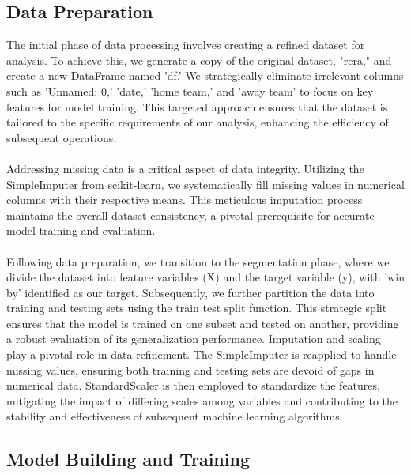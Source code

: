 \documentclass[letterpaper]{article}
\begin{document}
		\subsection*{Data Preparation}
		The initial phase of data processing involves creating a refined dataset for analysis. To achieve this, we generate a copy of the original dataset, "rera," and create a new DataFrame named 'df.' We strategically eliminate irrelevant columns such as 'Unnamed: 0,' 'date,' 'home team,' and 'away team' to focus on key features for model training. This targeted approach ensures that the dataset is tailored to the specific requirements of our analysis, enhancing the efficiency of subsequent operations.\\\\
		Addressing missing data is a critical aspect of data integrity. Utilizing the SimpleImputer from scikit-learn, we systematically fill missing values in numerical columns with their respective means. This meticulous imputation process maintains the overall dataset consistency, a pivotal prerequisite for accurate model training and evaluation.\\\\
		Following data preparation, we transition to the segmentation phase, where we divide the dataset into feature variables (X) and the target variable (y), with 'win by' identified as our target. Subsequently, we further partition the data into training and testing sets using the train test split function. This strategic split ensures that the model is trained on one subset and tested on another, providing a robust evaluation of its generalization performance.
		Imputation and scaling play a pivotal role in data refinement. The SimpleImputer is reapplied to handle missing values, ensuring both training and testing sets are devoid of gaps in numerical data. StandardScaler is then employed to standardize the features, mitigating the impact of differing scales among variables and contributing to the stability and effectiveness of subsequent machine learning algorithms.
		
		\newpage
		\subsection*{Model Building and Training}
\end{document}
